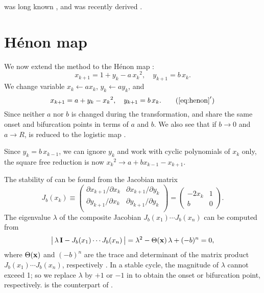 \documentclass[preprint]{revtex4-1}
\begin{document}
 was long known \cite{mira},
and  was recently derived \cite{blackhurst}.




\section{\label{sec:henon}H\'enon map}





We now extend the method to the H\'enon map \cite{henon}:
\begin{equation}
  x_{k+1} = 1 + y_k - a \, {x_k}^2, \quad
  y_{k+1} = b \, x_k.
\label{eq:henon}
\end{equation}
%
We change variable $x_k \leftarrow a x_k$, $y_k \leftarrow a y_k$, and
\begin{equation}
  x_{k+1} = a + y_k - {x_k}^2, \quad
  y_{k+1} = b \, x_k.
\tag{$\ref{eq:henon}'$}
\label{eq:henons}
\end{equation}
%
Since neither $a$ nor $b$ is changed during the transformation,
 and  share the
same onset and bifurcation points
in terms of $a$ and $b$.
%
We also see that if $b \rightarrow 0$ and $a \rightarrow R$,
 is reduced to the logistic map .


Since $y_k = b \, x_{k-1}$, we can ignore $y_k$ and work with
  cyclic polynomials of $x_k$ only,
the square free reduction is now
${x_k}^2 \rightarrow a + b x_{k-1} - x_{k+1}$.



The stability of  can be found from the Jacobian matrix
\[
  J_b(x_k)
  \equiv \left(
    \begin{array}{ccc}
      \partial x_{k+1}/\partial x_k & \partial x_{k+1}/\partial y_k \\
      \partial y_{k+1}/\partial x_k & \partial y_{k+1}/\partial y_k \\
    \end{array}
  \right)
  =
  \left(
    \begin{array}{ccc}
      -2 x_k & 1 \\
      b & 0
    \end{array}
  \right).
\]
The eigenvalue $\lambda$ of the composite Jacobian
$J_b(x_1) \cdots J_b(x_n)$ can be computed from
%
\begin{equation}
\big|\, \lambda \, \mathbf{I} - J_b(x_1) \cdots J_b(x_n) \,\big|
  = \lambda^2 - \Theta(\mathbf{x}) \,\lambda +(-b)^n = 0,
\label{eq:henonder}
\end{equation}
%
where $\Theta(\mathbf{x})$ and $(-b)^n$
are the trace and determinant of
the matrix product $J_b(x_1) \cdots J_b(x_n)$,
respectively \cite{hitzl}.
In a stable cycle, the magnitude of $\lambda$
cannot exceed 1; so we replace $\lambda$ by $+1$ or $-1$
in 
to obtain the onset or bifurcation point, respectively.
 is the counterpart of .
\end{document}
